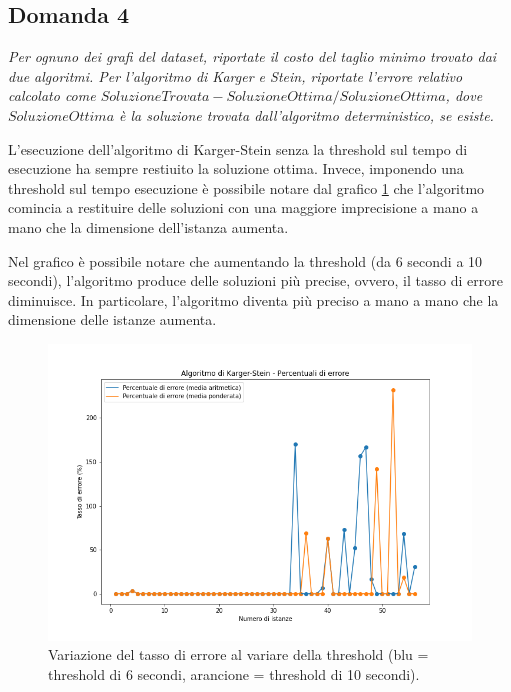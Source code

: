 \subsection{Domanda 4}
\textit{Per ognuno dei grafi del dataset, riportate il costo del taglio minimo trovato dai due algoritmi. Per l'algoritmo di Karger e Stein, riportate l'errore relativo calcolato come $SoluzioneTrovata-SoluzioneOttima/SoluzioneOttima$, dove $SoluzioneOttima$ è la soluzione trovata dall'algoritmo deterministico, se esiste.}

L'esecuzione dell'algoritmo di Karger-Stein senza la threshold sul 
tempo di esecuzione ha sempre restiuito la soluzione ottima. Invece, 
imponendo una threshold sul tempo esecuzione è possibile notare dal 
grafico \ref{fig:karger_stein_tassi_di_errore} che l'algoritmo 
comincia a restituire delle soluzioni con una maggiore imprecisione 
a mano a mano che la dimensione dell'istanza aumenta.

Nel grafico è possibile notare che aumentando la threshold 
(da 6 secondi a 10 secondi), l'algoritmo produce delle soluzioni più 
precise, ovvero, il tasso di errore diminuisce. In particolare, 
l'algoritmo diventa più preciso a mano a mano che la dimensione delle 
istanze aumenta.

\begin{figure}[H]
	\centering
	\includegraphics[width=1\textwidth]{res/images/single/karger-stein/tasso-di-errore/karger_stein_tassi_di_errore.png}
	\caption{Variazione del tasso di errore al variare della threshold
	(blu = threshold di 6 secondi, arancione = threshold di 10 secondi).}
	\label{fig:karger_stein_tassi_di_errore}
\end{figure}


